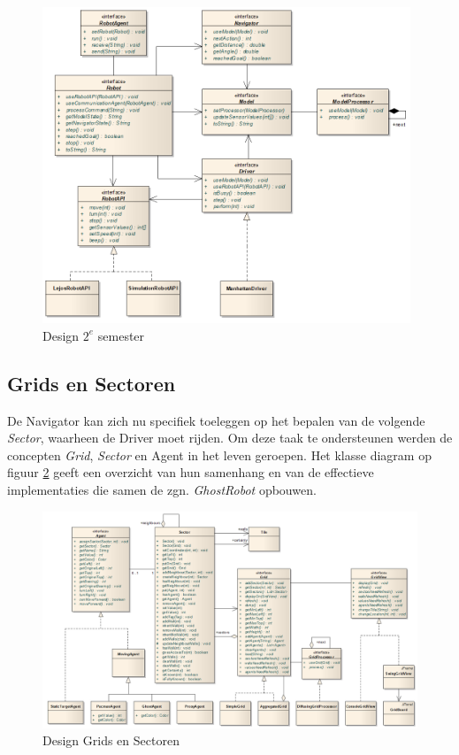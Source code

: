 \documentclass[12pt,a4paper]{report}
\begin{document}
\begin{figure}[htbp]
  \centering
  \includegraphics[width=110mm]{resources/design-semester2.png}
  \caption{Design $2^e$ semester}
  \label{uml:design-semster2}
\end{figure}

\subsection{Grids en Sectoren}

De Navigator kan zich nu specifiek toeleggen op het bepalen van de volgende \emph{Sector}, waarheen de Driver moet rijden. Om deze taak te ondersteunen werden de concepten \emph{Grid}, \emph{Sector} en Agent in het leven geroepen. Het klasse diagram op figuur \ref{uml:grids-sectoren} geeft een overzicht van hun samenhang en van de effectieve implementaties die samen de zgn. \emph{GhostRobot} opbouwen.

\begin{figure}[htbp]
  \centering
  \includegraphics[width=200mm, angle=90]{resources/grids-sectors.png}
  \caption{Design Grids en Sectoren}
  \label{uml:grids-sectoren}
\end{figure}
\end{document}
